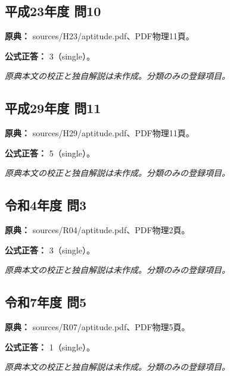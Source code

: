 \subsection{平成23年度 問10}
\label{q:h23-reg-apt-10}

\noindent\textbf{原典：} sources/H23/aptitude.pdf、PDF物理11頁。

\textbf{公式正答：} 3（single）。

\par\textit{原典本文の校正と独自解説は未作成。分類のみの登録項目。}

\subsection{平成29年度 問11}
\label{q:h29-reg-apt-11}

\noindent\textbf{原典：} sources/H29/aptitude.pdf、PDF物理11頁。

\textbf{公式正答：} 5（single）。

\par\textit{原典本文の校正と独自解説は未作成。分類のみの登録項目。}

\subsection{令和4年度 問3}
\label{q:r04-reg-apt-03}

\noindent\textbf{原典：} sources/R04/aptitude.pdf、PDF物理2頁。

\textbf{公式正答：} 3（single）。

\par\textit{原典本文の校正と独自解説は未作成。分類のみの登録項目。}

\subsection{令和7年度 問5}
\label{q:r07-reg-apt-05}

\noindent\textbf{原典：} sources/R07/aptitude.pdf、PDF物理5頁。

\textbf{公式正答：} 1（single）。

\par\textit{原典本文の校正と独自解説は未作成。分類のみの登録項目。}
